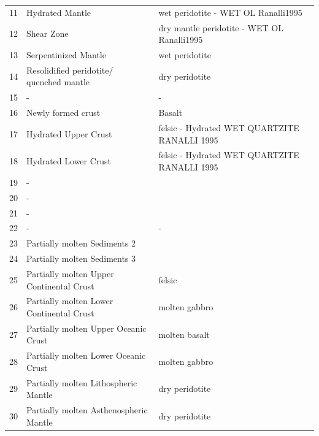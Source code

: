 \begin{table}[H]
\begin{tabular}{l p{6cm} p{8cm}}
		\rowcolor[rgb]{0.5412    0.7216    0.9922}
		11 & Hydrated Mantle & wet peridotite - WET OL Ranalli1995 \\
		\rowcolor[rgb]{0    0.5020    1.0000}
		12 & Shear Zone & dry mantle peridotite - WET OL Ranalli1995 \\
		\rowcolor[rgb]{0         0    0.4902}
		13 & Serpentinized Mantle & wet peridotite \\
		\rowcolor[rgb]{ 0.7000    0.1200    0.3000}
		14 & Resolidified peridotite/ quenched mantle & dry peridotite \\
		\rowcolor[rgb]{1.0000    1.0000    1.0000}
		15 & - & - \\
		\rowcolor[rgb]{0.3137    0.8941    0.2470}
		16 & Newly formed crust & Basalt \\
		\rowcolor[rgb]{0.5412    0.7216    0.9922}
		17 & Hydrated Upper Crust & felsic - Hydrated WET QUARTZITE RANALLI 1995 \\
		\rowcolor[rgb]{0.5412    0.7216    0.9922}
		18 & Hydrated Lower Crust & felsic - Hydrated WET QUARTZITE RANALLI 1995 \\
		\rowcolor[rgb]{1.0000    1.0000    1.0000}
		19 & - & \\
		\midrule
		\rowcolor[rgb]{1.0000    1.0000    1.0000}
		20 & - & \\
		\rowcolor[rgb]{1.0000    1.0000    1.0000}
		21 & - & \\
		\rowcolor[rgb]{1.0000    1.0000    1.0000}
		22 & - & - \\
		\rowcolor[rgb]{1.0000    1.0000    0.3176}
		23 & Partially molten Sediments 2 & \\
		\rowcolor[rgb]{1.0000    0.9020    0.1882}
		24 & Partially molten Sediments 3 & \\
		\rowcolor[rgb]{0.4667    0.4667    0.2353}
		25 & Partially molten Upper Continental Crust & felsic \\
		\rowcolor[rgb]{0.5020    0.5020         0}
		26 & Partially molten Lower Continental Crust & molten gabbro \\
		\rowcolor[rgb]{0.7255    0.0157    0.7843}
		27 & Partially molten Upper Oceanic Crust & molten basalt \\
		\rowcolor[rgb]{0.9255    0.4392    0.9961}
		28 & Partially molten Lower Oceanic Crust & molten gabbro \\
		\rowcolor[rgb]{1.0000         0         0}
		29 & Partially molten Lithospheric Mantle & dry peridotite \\
		\rowcolor[rgb]{1.0000         0         0}
		30 & Partially molten Asthenospheric Mantle & dry peridotite \\

\end{tabular}
\end{table}
